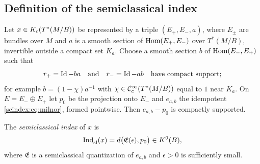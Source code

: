 \subsection{Definition of the semiclassical index}
Let $x\in K_{\mathrm{c}}(T^*(M/B))$ be represented by a triple $(E_+,E_-,a)$, where $E_\pm$ are
bundles over $M$ and $a$ is a smooth section of $\operatorname{Hom}(E_+,E_-)$ over $T^*(M/B)$,
invertible outside a compact set $K_a$. Choose a smooth section $b$ of
$\operatorname{Hom}(E_-,E_+)$ such that
\begin{equation}\label{scindex:eq:b}
  r_+=\operatorname{Id}-ba\quad\text{and}\quad r_-=\operatorname{Id}-ab\quad\text{have compact support};
\end{equation}
for example $b=(1-\chi)a^{-1}$ with $\chi\in\mathcal{C}^\infty_{\mathrm{c}}(T^*(M/B))$ equal to $1$ near
$K_a$. On $E=E_-\oplus E_+$ let $p_0$ be the projection onto $E_-$ and
$e_{a,b}$ the idempotent \eqref{scindex:eq:milnor}, formed pointwise. Then
$e_{a,b}-p_0$ is compactly supported.

\begin{definition}\label{scindex:def:Indsl}
  The \emph{semiclassical index} of $x$ is
  \begin{equation*}
    \operatorname{Ind}^{}_{\mathrm{sl}}(x)=d\bigl(\mathfrak E(\epsilon),p_0\bigr)\in K^0(B),
  \end{equation*}
  where $\mathfrak E$ is a semiclassical quantization of $e_{a,b}$ and
  $\epsilon>0$ is sufficiently small.
\end{definition}

